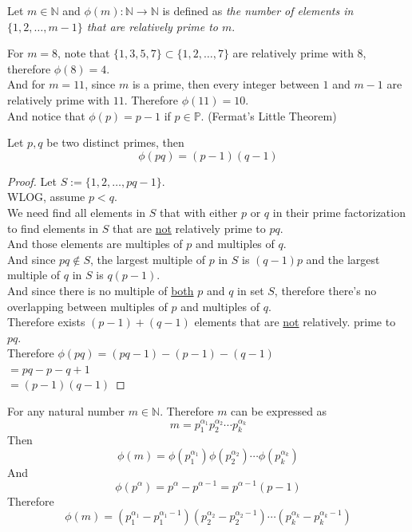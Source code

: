\documentclass[11pt]{article}
\begin{document}
	\begin{definition} Let $m \in \mathbb{N}$ and $\phi(m): \mathbb{N} \to \mathbb{N}$ is defined as \emph{the number of elements in $\{1, 2, \dots, m-1\}$ that are relatively prime to $m$}.	
	\end{definition}
	
	\begin{example}
		For $m = 8$, note that $\{1, 3, 5, 7\} \subset \{1,2,\dots,7\}$ are relatively prime with 8, therefore $\phi(8) = 4$. \\
		And for $m=11$, since $m$ is a prime, then every integer between $1$ and $m-1$ are relatively prime with $11$. Therefore $\phi(11)=10$. \\
		And notice that $\phi(p) = p-1$ if $p \in \mathbb{P}$. (Fermat's Little Theorem)\\
	\end{example}
	
	\begin{proposition}
		Let $p, q$ be two distinct primes, then \[ \phi(pq) = (p-1)(q-1) \]
	\end{proposition}
	\begin{proof}
		Let $S:= \{1, 2, \dots, pq - 1\}$. \\
		WLOG, assume $p < q$. \\
		We need find all elements in $S$ that with either $p$ or $q$ in their prime factorization to find elements in $S$ that are \ul{not} relatively prime to $pq$. \\
		And those elements are multiples of $p$ and multiples of $q$. \\
		And since $pq \notin S$, the largest multiple of $p$ in $S$ is $(q-1)p$ and the largest multiple of $q$ in $S$ is $q(p-1)$. \\
		And since there is no multiple of \ul{both} $p$ and $q$ in set $S$, therefore there's no overlapping between multiples of $p$ and multiples of $q$.\\
		Therefore exists $(p-1)+(q-1)$ elements that are \ul{not} relatively. prime to $pq$. \\
		Therefore $\phi(pq) = (pq-1)-(p-1)-(q-1)$ \\
		$=pq-p-q+1$ \\
		$=(p-1)(q-1)$
	\end{proof}
	
	\begin{proposition}
		For any natural number $m \in \mathbb{N}$. Therefore $m$ can be expressed as 
		\[
			m = p_1^{\alpha_1} p_2^{\alpha_2} \cdots p_k^{\alpha_k}
		\]
		Then 
		\[
			\phi(m) = \phi(p_1^{\alpha_1}) \phi(p_2^{\alpha_2}) \cdots \phi(p_k^{\alpha_k})
		\]
		And 
		\[
			\phi(p^\alpha) = p^\alpha - p^{\alpha - 1}= p^{\alpha - 1} (p - 1)
		\]
		Therefore
		\[
			\phi(m) = (p_1^{\alpha_1} - p_1^{\alpha_1 - 1})(p_2^{\alpha_2} - p_2^{\alpha_2 - 1}) \cdots (p_k^{\alpha_k} - p_k^{\alpha_k - 1})
		\]
	\end{proposition}
	
\end{document}
